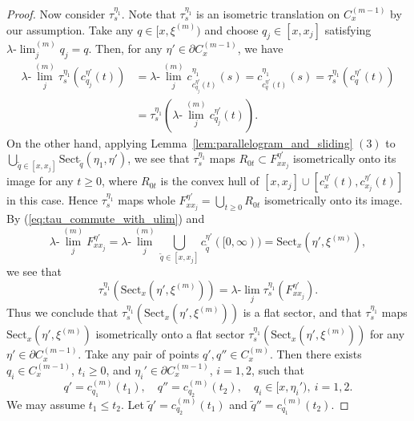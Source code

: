 \documentclass[12pt]{amsart}
\numberwithin{equation}{section}
\theoremstyle{plain}
\theoremstyle{definition}
\theoremstyle{remark}
\newcommand{\uulim}[1][]{\lambda{\text{-}}\!{\lim}^{(#1)}}
\newcommand{\ulim}{\lambda{\text{-}}\!\lim}
\newcommand{\xxi}[1]{\xi^{(#1)}}
\newcommand{\ray}[1]{[#1)}
\newcommand{\cc}[2]{c_{#1}^{#2}}
\newcommand{\trans}[2]{\tau_{#1}^{#2}}
\newcommand{\sect}[3][]{\mathrm{Sect}_{#1}(#2,#3)}
\newcommand{\cone}[2][]{C_{#1}^{(#2)}}
\begin{document}
\begin{proof}
 Now consider $\trans{s}{\eta_1}$. 
 Note that $\trans{s}{\eta_1}$ is an isometric translation on
 $\cone[x]{m-1}$ by our assumption. 
 Take any $q \in \ray{x,\xxi{m}}$ and choose $q_j \in [x,x_j]$
 satisfying $\uulim[m]_j q_j=q$. 
 Then, for any $\eta' \in \partial \cone[x]{m-1}$, we have
 \begin{equation}
 \begin{split}
   \label{eq:tau_commute_with_ulim}
  \uulim[m]_j \trans{s}{\eta_1}(\cc{q_j}{\eta'}(t))
  & = \uulim[m]_j \cc{\cc{q_j}{\eta'}(t)}{\eta_1}(s)
  = \cc{\cc{q}{\eta'}(t)}{\eta_1}(s)
  =\trans{s}{\eta_1}(\cc{q}{\eta'}(t)) \\
  & =\trans{s}{\eta_1}(\uulim[m]_j \cc{q_j}{\eta'}(t)). 
 \end{split} 
 \end{equation}
 On the other hand, applying
 Lemma~\ref{lem:parallelogram_and_sliding} $(3)$ to 
 $\bigcup_{\tilde q \in [x,x_j]}\sect[\tilde q]{\eta_1}{\eta'}$, 
 we see that
 $\trans{s}{\eta_1}$ maps $R_{0t} \subset F_{xx_j}^{\eta'}$ 
 isometrically onto its image for any $t\geq 0$, 
 where $R_{0t}$ is the convex hull of 
 $[x,x_j]\cup [\cc{x}{\eta'}(t), \cc{x_j}{\eta'}(t)]$ in this case.
 Hence
 $\trans{s}{\eta_1}$ maps whole 
 $F_{xx_j}^{\eta'}=\bigcup_{t\geq 0}R_{0t}$ isometrically onto its
 image. 
 By (\ref{eq:tau_commute_with_ulim}) and 
\begin{equation*}
  \uulim[m]_j F_{xx_j}^{\eta'}=
  \uulim[m]_j \bigcup_{\tilde q \in [x,x_j]}
   \cc{\tilde q}{\eta'}(\ray{0,\infty})= 
  \sect[x]{\eta'}{\xxi{m}}, 
\end{equation*} 
we see that
 \begin{equation*}
 \trans{s}{\eta_1}(\sect[x]{\eta'}{\xxi{m}}) =
  \ulim_j \trans{s}{\eta_1}(F_{xx_j}^{\eta'}). 
 \end{equation*}
 Thus we conclude that 
 $\trans{s}{\eta_1}(\sect[x]{\eta'}{\xxi{m}})$ is a flat sector, 
 and that $\trans{s}{\eta_1}$ maps $\sect[x]{\eta'}{\xxi{m}}$
 isometrically onto a flat sector 
 $\trans{s}{\eta_1}(\sect[x]{\eta'}{\xxi{m}})$ for any 
 $\eta' \in \partial \cone[x]{m-1}$. 
 Take any pair of points $q',q'' \in \cone[x]{m}$. 
 Then there exists $q_i \in \cone[x]{m-1}$, $t_i\geq 0$, and 
 $\eta_i' \in \partial \cone[x]{m-1}$, $i=1,2$,
 such that 
\begin{equation*}
 q'= \cc{q_1}{(m)}(t_1), \quad 
 q'' = \cc{q_2}{(m)}(t_2), \quad q_i \in \ray{x,\eta_i'},\ i=1,2. 
\end{equation*}
 We may assume $t_1 \leq t_2$. 
 Let $\tilde q'=\cc{q_2}{(m)}(t_1)$ and $\tilde q''=\cc{q_1}{(m)}(t_2)$. 

\end{proof}
\end{document}
